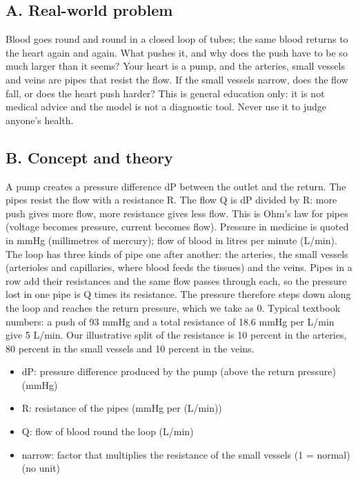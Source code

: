 \documentclass[11pt,a4paper]{article}
\begin{document}
\subsection*{A. Real-world problem}
Blood goes round and round in a closed loop of tubes; the same blood returns to the heart again and again. What pushes it, and why does the push have to be so much larger than it seems? Your heart is a pump, and the arteries, small vessels and veins are pipes that resist the flow. If the small vessels narrow, does the flow fall, or does the heart push harder? This is general education only: it is not medical advice and the model is not a diagnostic tool. Never use it to judge anyone's health.

\subsection*{B. Concept and theory}
A pump creates a pressure difference dP between the outlet and the return. The pipes resist the flow with a resistance R. The flow Q is dP divided by R: more push gives more flow, more resistance gives less flow. This is Ohm's law for pipes (voltage becomes pressure, current becomes flow). Pressure in medicine is quoted in mmHg (millimetres of mercury); flow of blood in litres per minute (L/min). The loop has three kinds of pipe one after another: the arteries, the small vessels (arterioles and capillaries, where blood feeds the tissues) and the veins. Pipes in a row add their resistances and the same flow passes through each, so the pressure lost in one pipe is Q times its resistance. The pressure therefore steps down along the loop and reaches the return pressure, which we take as 0. Typical textbook numbers: a push of 93 mmHg and a total resistance of 18.6 mmHg per L/min give 5 L/min. Our illustrative split of the resistance is 10 percent in the arteries, 80 percent in the small vessels and 10 percent in the veins.

\begin{itemize}[nosep]
\item dP: pressure difference produced by the pump (above the return pressure) (mmHg)
\item R: resistance of the pipes (mmHg per (L/min))
\item Q: flow of blood round the loop (L/min)
\item narrow: factor that multiplies the resistance of the small vessels (1 = normal) (no unit)
\end{itemize}
\end{document}
